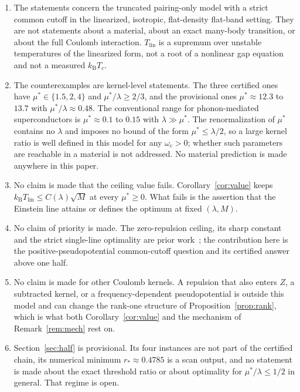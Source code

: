 \documentclass[11pt]{article}
\newcommand{\kb}{k_{\mathrm B}}
\newcommand{\Tlin}{T_{\mathrm{lin}}}
\newcommand{\muS}{\mu^{*}}
\theoremstyle{definition}
\theoremstyle{remark}
\begin{document}
\begin{enumerate}[label=(\arabic*),leftmargin=2.2em]
\item The statements concern the truncated pairing-only model with a strict common cutoff
in the linearized, isotropic, flat-density flat-band setting. They are not statements
about a material, about an exact many-body transition, or about the full Coulomb
interaction. $\Tlin$ is a supremum over unstable temperatures of the linearized form, not
a root of a nonlinear gap equation and not a measured $\kb T_c$.
\item The counterexamples are kernel-level statements. The three certified ones have
$\muS\in\{1.5,2,4\}$ and $\muS/\lambda\ge2/3$, and the provisional ones
$\muS\approx12.3$ to $13.7$ with $\muS/\lambda\approx0.48$. The conventional range for
phonon-mediated superconductors is $\muS\approx0.1$ to $0.15$ with $\lambda\gg\muS$. The
renormalization of $\muS$ contains no $\lambda$ and imposes no bound of the form
$\muS\le\lambda/2$, so a large kernel ratio is well defined in this model for any
$\omega_c>0$; whether such parameters are reachable in a material is not addressed. No
material prediction is made anywhere in this paper.
\item No claim is made that the ceiling value fails. Corollary~\ref{cor:value} keeps
$\kb\Tlin\le C(\lambda)\sqrt M$ at every $\muS\ge0$. What fails is the assertion that the
Einstein line attains or defines the optimum at fixed $(\lambda,M)$.
\item No claim of priority is made. The zero-repulsion ceiling, its sharp constant and the
strict single-line optimality are prior work~\cite{rens,kondratev,finiteband,gamma}; the
contribution here is the positive-pseudopotential common-cutoff question and its
certified answer above one half.
\item No claim is made for other Coulomb kernels. A repulsion that also enters $Z$, a
subtracted kernel, or a frequency-dependent pseudopotential is outside this model and can
change the rank-one structure of Proposition~\ref{prop:rank}, which is what both
Corollary~\ref{cor:value} and the mechanism of Remark~\ref{rem:mech} rest on.
\item Section~\ref{sec:half} is provisional. Its four instances are not part of the
certified chain, its numerical minimum $r_*\approx0.4785$ is a scan output, and no
statement is made about the exact threshold ratio or about optimality for
$\muS/\lambda\le1/2$ in general. That regime is open.
\end{enumerate}
\end{document}
